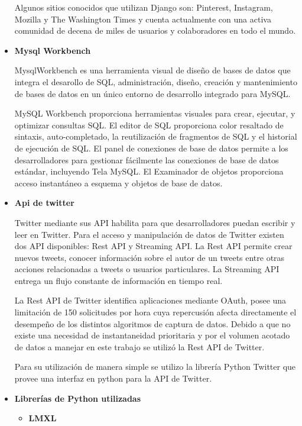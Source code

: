 \begin{itemize}
	Algunos sitios conocidos que utilizan Django son: Pinterest, Instagram, Mozilla y The Washington Times y cuenta actualmente con una activa comunidad de decena de miles de usuarios y colaboradores en todo el mundo.
	
	\item \textbf{Mysql Workbench}
	
	MysqlWorkbench \cite{mysqlWorkbenchWeb} es una herramienta visual de diseño de bases de datos que integra el desarollo de SQL, administración, diseño, creación y mantenimiento de bases de datos en un único entorno de desarrollo integrado para MySQL.
	
	MySQL Workbench proporciona herramientas visuales para crear, ejecutar, y optimizar consultas SQL. El editor de SQL proporciona color resaltado de sintaxis, auto-completado, la reutilización de fragmentos de SQL y el historial de ejecución de SQL. El panel de conexiones de base de datos permite a los desarrolladores para gestionar fácilmente las conexiones de base de datos estándar, incluyendo Tela MySQL. El Examinador de objetos proporciona acceso instantáneo a esquema y objetos de base de datos.
	
	\item \textbf{Api de twitter}
	
	Twitter mediante sus API \cite{twitterWeb} habilita para que desarrolladores puedan escribir y leer en Twitter. Para el acceso y manipulación de datos de Twitter existen dos API disponibles: Rest API y Streaming API. La Rest API permite crear nuevos tweets, conocer información sobre el autor de un tweets entre otras acciones relacionadas a tweets o usuarios particulares. La Streaming API entrega un flujo constante de información en tiempo real.
	
	La Rest API de Twitter identifica aplicaciones mediante OAuth, posee una limitación de 150 solicitudes por hora cuya repercusión afecta directamente el desempeño de los distintos algoritmos de captura de datos. Debido a que no existe una necesidad de instantaneidad prioritaria y por el volumen acotado de datos a manejar en este trabajo se utilizó la Rest API de Twitter.
	
	Para su utilización de manera simple se utilizo la librería Python Twitter \cite{pythonTwitterCode} \cite{pythonTwitterGithub} que provee una interfaz en python para la API de Twitter. 
	
	
	\item \textbf{Librerías de Python utilizadas}
		\begin{itemize}
			\item \textbf{LMXL}\label{itm:lxml}
			

\end{itemize}
\end{itemize}

